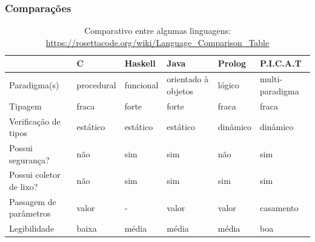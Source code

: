 \documentclass{beamer}
\begin{document}
\begin{frame}
    \frametitle{Comparações}
    \begin{table}[!bh]
\centering
\caption{Comparativo entre algumas linguagens: \url{https://rosettacode.org/wiki/Language_Comparison_Table}}
\label{tabela_ling_refs}
{\tiny
\begin{tabular}{p{2cm}|p{1cm}|p{1cm}|p{1cm}|p{1cm}|p{1cm}}\hline \hline
      &\textbf{C}  &  \textbf{Haskell} &  \textbf{Java} &  \textbf{Prolog} &  \textbf{P.I.C.A.T}\\ \hline \hline
	    
Paradigma(s)	                        & procedural                                    & funcional                               & orientado à objetos   &  lógico                                             & multi-paradigma \\
\hline 

Tipagem	        & fraca                                         & forte                                   & forte                  &  fraca                                                         & fraca \\
\hline 

Verificação de tipos	                & estático                                      & estático                                & estático                              & dinâmico                                   & dinâmico \\

\hline  
Possui segurança?	                & não                                             & sim                                      & sim                                            & não                                          & sim\\

\hline  
Possui coletor de lixo?	                        & não                                                                        & sim                 &  sim                  & sim                                     & sim \\

\hline  
Passagem de parâmetros	                &  valor & -                                       &  valor                                     &  valor & casamento \\

\hline   
Legibilidade	  & baixa   & média     & média &  média       & boa \\


\hline 
\hline
\end{tabular} 
}

\end{table}
\end{frame}
\end{document}
